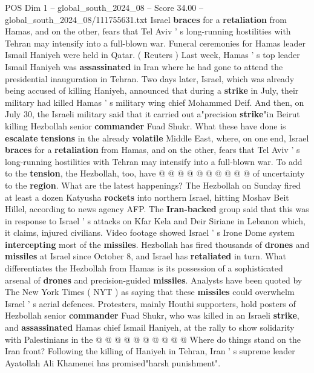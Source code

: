 \begin{textsample}{POS Dim 1 – global\_south\_2024\_08 – Score 34.00 – global\_south\_2024\_08/111755631.txt}  \label{ex:f1_pos_002}
Israel \textbf{braces} for a \textbf{retaliation} from Hamas, and on the other, fears that Tel Aviv ' s long-running hostilities with Tehran may intensify into a full-blown war.
Funeral ceremonies for Hamas leader Ismail Haniyeh were held in Qatar. ( Reuters ) Last week, Hamas ' s top leader Ismail Haniyeh was \textbf{assassinated} in Iran where he had gone to attend the presidential inauguration in Tehran.
Two days later, Israel, which was already being accused of killing Haniyeh, announced that during a \textbf{strike} in July, their military had killed Hamas ' s military wing chief Mohammed Deif.
And then, on July 30, the Israeli military said that it carried out a"precision \textbf{strike}"in Beirut killing Hezbollah senior \textbf{commander} Fuad Shukr.
What these have done is \textbf{escalate} \textbf{tensions} in the already \textbf{volatile} Middle East, where, on one end, Israel \textbf{braces} for a \textbf{retaliation} from Hamas, and on the other, fears that Tel Aviv ' s long-running hostilities with Tehran may intensify into a full-blown war.
To add to the \textbf{tension}, the Hezbollah, too, have @ @ @ @ @ @ @ @ @ @ of uncertainty to the \textbf{region}.
What are the latest happenings?
The Hezbollah on Sunday fired at least a dozen Katyusha \textbf{rockets} into northern Israel, hitting Moshav Beit Hillel, according to news agency AFP.
The \textbf{Iran-backed} group said that this was in response to Israel ' s attacks on Kfar Kela and Deir Siriane in Lebanon which, it claims, injured civilians.
Video footage showed Israel ' s Irone Dome system \textbf{intercepting} most of the \textbf{missiles}.
Hezbollah has fired thousands of \textbf{drones} and \textbf{missiles} at Israel since October 8, and Israel has \textbf{retaliated} in turn.
What differentiates the Hezbollah from Hamas is its possession of a sophisticated arsenal of \textbf{drones} and precision-guided \textbf{missiles}.
Analysts have been quoted by The New York Times ( NYT ) as saying that these \textbf{missiles} could overwhelm Israel ' s aerial defences.
Protesters, mainly Houthi supporters, hold posters of Hezbollah senior \textbf{commander} Fuad Shukr, who was killed in an Israeli \textbf{strike}, and \textbf{assassinated} Hamas chief Ismail Haniyeh, at the rally to show solidarity with Palestinians in the @ @ @ @ @ @ @ @ @ @ Where do things stand on the Iran front?
Following the killing of Haniyeh in Tehran, Iran ' s supreme leader Ayatollah Ali Khamenei has promised"harsh punishment".

\end{textsample}
